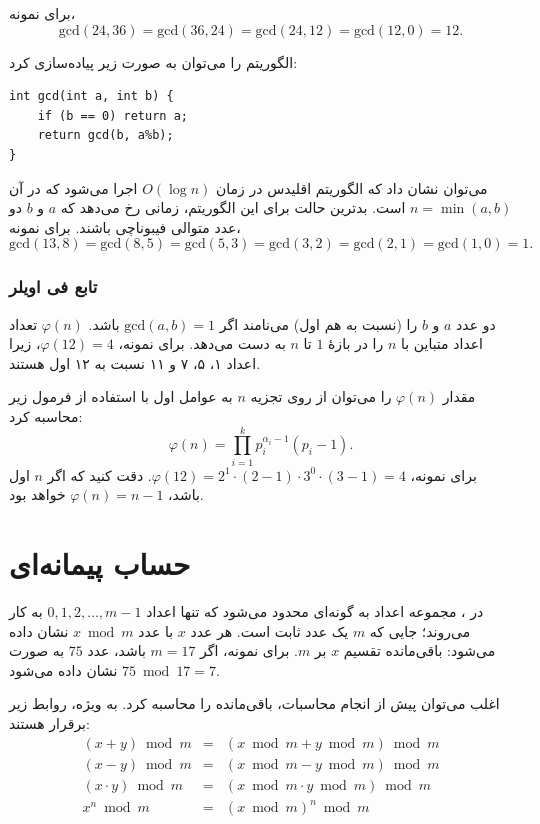 برای نمونه،
\[\textrm{gcd}(24,36) = \textrm{gcd}(36,24)
= \textrm{gcd}(24,12) = \textrm{gcd}(12,0)=12.\]

الگوریتم را می‌توان به صورت زیر پیاده‌سازی کرد:
\begin{lstlisting}
int gcd(int a, int b) {
    if (b == 0) return a;
    return gcd(b, a%b);
}
\end{lstlisting}

می‌توان نشان داد که الگوریتم اقلیدس در زمان
$O(\log n)$ اجرا می‌شود که در آن $n=\min(a,b)$ است.
بدترین حالت برای این الگوریتم،
زمانی رخ می‌دهد که $a$ و $b$ دو عدد متوالی فیبوناچی باشند.
برای نمونه،
\[\textrm{gcd}(13,8)=\textrm{gcd}(8,5)
=\textrm{gcd}(5,3)=\textrm{gcd}(3,2)=\textrm{gcd}(2,1)=\textrm{gcd}(1,0)=1.\]

\subsubsection{تابع فی اویلر}


دو عدد $a$ و $b$ را  (نسبت به هم اول) می‌نامند
اگر $\textrm{gcd}(a,b)=1$ باشد.
 $\varphi(n)$
تعداد اعداد متباین با $n$
را در بازهٔ $1$ تا $n$ به دست می‌دهد.
برای نمونه، $\varphi(12)=4$،
زیرا اعداد ۱، ۵، ۷ و ۱۱
نسبت به ۱۲ اول هستند.

مقدار $\varphi(n)$ را می‌توان از روی
تجزیه $n$ به عوامل اول
با استفاده از فرمول زیر محاسبه کرد:
\[ \varphi(n) = \prod_{i=1}^k p_i^{\alpha_i-1}(p_i-1). \]
برای نمونه، $\varphi(12)=2^1 \cdot (2-1) \cdot 3^0 \cdot (3-1)=4$.
دقت کنید که اگر $n$ اول باشد، $\varphi(n)=n-1$ خواهد بود.

\section{حساب پیمانه‌ای}


در ،
مجموعه اعداد به گونه‌ای محدود می‌شود که
تنها اعداد $0,1,2,\ldots,m-1$ به کار می‌روند؛
جایی که $m$ یک عدد ثابت است.
هر عدد $x$ با
عدد $x \bmod m$ نشان داده می‌شود:
باقی‌مانده تقسیم $x$ بر $m$.
برای نمونه، اگر $m=17$ باشد، عدد $75$
به صورت $75 \bmod 17 = 7$ نشان داده می‌شود.

اغلب می‌توان پیش از انجام محاسبات،
باقی‌مانده را محاسبه کرد.
به ویژه، روابط زیر برقرار هستند:
\[
\begin{array}{rcl}
(x+y) \bmod m & = & (x \bmod m + y \bmod m) \bmod m \\
(x-y) \bmod m & = & (x \bmod m - y \bmod m) \bmod m \\
(x \cdot y) \bmod m & = & (x \bmod m \cdot y \bmod m) \bmod m \\
x^n \bmod m & = & (x \bmod m)^n \bmod m \\
\end{array}
\]

